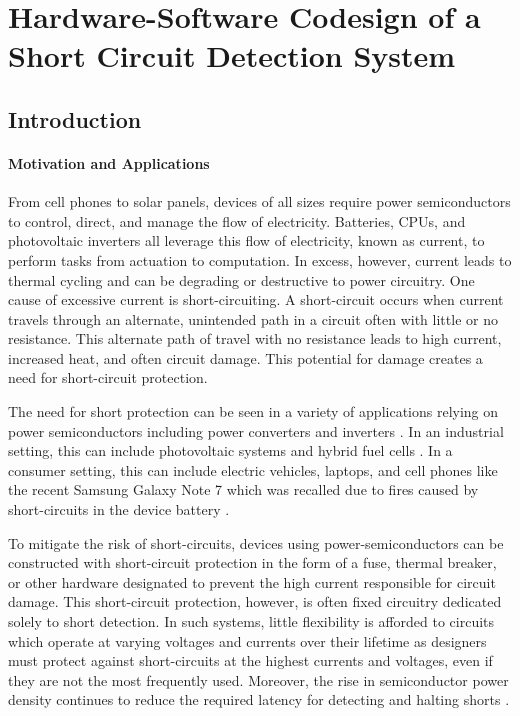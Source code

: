 \section{Hardware-Software Codesign of a Short Circuit Detection System}   \label{chap:scd}

\subsection{Introduction}   \label{subsec:hardwareSoftwarreCodesign}

\paragraph{Motivation and Applications}
From cell phones to solar panels, devices of all sizes require power semiconductors to control, direct, and manage the flow of electricity.
Batteries, CPUs, and photovoltaic inverters all leverage this flow of electricity, known as current, to perform tasks from actuation to computation.
In excess, however, current leads to thermal cycling and can be degrading or destructive to power circuitry.
One cause of excessive current is short-circuiting.
A short-circuit occurs when current travels through an alternate, unintended path in a circuit often with little or no resistance.
This alternate path of travel with no resistance leads to high current, increased heat, and often circuit damage.
This potential for damage creates a need for short-circuit protection.

The need for short protection can be seen in a variety of applications relying on power semiconductors including power converters and inverters \cite{horiguchi_high-speed_2015}.
In an industrial setting, this can include photovoltaic systems and hybrid fuel cells \cite{zhang_model-based_2011}. 
In a consumer setting, this can include electric vehicles, laptops, and cell phones like the recent Samsung Galaxy Note 7 which was recalled due to fires caused by short-circuits in the device battery \cite{hollister_heres_2016}.

To mitigate the risk of short-circuits, devices using power-semiconductors can be constructed with short-circuit protection in the form of a fuse, thermal breaker, or other hardware designated to prevent the high current responsible for circuit damage. 
This short-circuit protection, however, is often fixed circuitry dedicated solely to short detection. In such systems, little flexibility is afforded to circuits which operate at varying voltages and currents over their lifetime as designers must protect against short-circuits at the highest currents and voltages, even if they are not the most frequently used. Moreover, the rise in semiconductor power density continues to reduce the required latency for detecting and halting shorts \cite{horiguchi_short_2014}.

